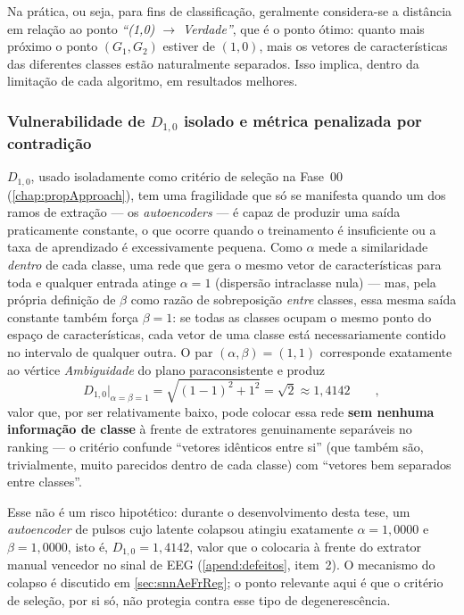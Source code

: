 			\par Na prática, ou seja, para fins de classificação, geralmente considera-se a distância em relação ao ponto \textit{``(1,0) $\rightarrow$ Verdade''}, que é o ponto ótimo: quanto mais próximo o ponto $(G_1,G_2)$ estiver de $(1,0)$, mais os vetores de características das diferentes classes estão naturalmente separados. Isso implica, dentro da limitação de cada algoritmo, em resultados melhores.

			\subsubsection{Vulnerabilidade de $D_{1,0}$ isolado e métrica penalizada por contradição}
				\label{sec:dPenalizado}

				\par $D_{1,0}$, usado isoladamente como critério de seleção na Fase~00 (\autoref{chap:propApproach}), tem uma fragilidade que só se manifesta quando um dos ramos de extração --- os \textit{autoencoders} --- é capaz de produzir uma saída praticamente constante, o que ocorre quando o treinamento é insuficiente ou a taxa de aprendizado é excessivamente pequena. Como $\alpha$ mede a similaridade \emph{dentro} de cada classe, uma rede que gera o mesmo vetor de características para toda e qualquer entrada atinge $\alpha=1$ (dispersão intraclasse nula) --- mas, pela própria definição de $\beta$ como razão de sobreposição \emph{entre} classes, essa mesma saída constante também força $\beta=1$: se todas as classes ocupam o mesmo ponto do espaço de características, cada vetor de uma classe está necessariamente contido no intervalo de qualquer outra. O par $(\alpha,\beta)=(1,1)$ corresponde exatamente ao vértice \textit{Ambiguidade} do plano paraconsistente e produz
				\begin{equation}
					D_{1,0}\big|_{\alpha=\beta=1} = \sqrt{(1-1)^2+1^2} = \sqrt2 \approx 1{,}4142 \qquad,
				\end{equation}
				valor que, por ser relativamente baixo, pode colocar essa rede \textbf{sem nenhuma informação de classe} à frente de extratores genuinamente separáveis no ranking --- o critério confunde ``vetores idênticos entre si'' (que também são, trivialmente, muito parecidos dentro de cada classe) com ``vetores bem separados entre classes''.

				\par Esse não é um risco hipotético: durante o desenvolvimento desta tese, um \textit{autoencoder} de pulsos cujo latente colapsou atingiu exatamente $\alpha=1{,}0000$ e $\beta=1{,}0000$, isto é, $D_{1,0}=1{,}4142$, valor que o colocaria à frente do extrator manual vencedor no sinal de \ac{EEG} (\autoref{apend:defeitos}, item~2). O mecanismo do colapso é discutido em \autoref{sec:snnAeFrReg}; o ponto relevante aqui é que o critério de seleção, por si só, não protegia contra esse tipo de degenerescência.

